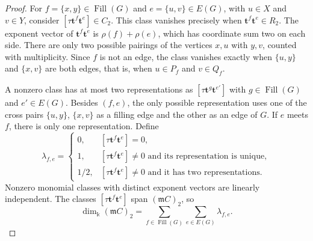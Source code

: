 \documentclass[a4paper,reqno,11pt]{amsart}
\newtheorem{lem}[thm]{Lemma}
\theoremstyle{definition}
\theoremstyle{remark}
\numberwithin{equation}{section}
\newcommand{\kk}{\Bbbk}
\newcommand{\tb}{\mathbf t}
\newcommand{\frakm}{\mathfrak m}
\newcommand{\Fill}{\operatorname{Fill}}
\begin{document}
\begin{proof}
    For $f=\{x,y\}\in\Fill(G)$ and $e=\{u,v\}\in E(G)$, with $u\in X$ and $v\in Y$, consider $[\tau\tb^f\tb^e]\in C_2$.
    This class vanishes precisely when $\tb^f\tb^e\in R_2$.
    The exponent vector of $\tb^f\tb^e$ is $\rho(f)+\rho(e)$, which has coordinate sum two on each side.
    There are only two possible pairings of the vertices $x,u$ with $y,v$, counted with multiplicity.
    Since $f$ is not an edge, the class vanishes exactly when $\{u,y\}$ and $\{x,v\}$ are both edges, that is, when $u\in P_f$ and $v\in Q_f$.

    A nonzero class has at most two representations as $[\tau\tb^g\tb^{e'}]$ with $g\in\Fill(G)$ and $e'\in E(G)$.
    Besides $(f,e)$, the only possible representation uses one of the cross pairs $\{u,y\}$, $\{x,v\}$ as a filling edge and the other as an edge of $G$.
    If $e$ meets $f$, there is only one representation.
    Define
    \[
        \lambda_{f,e}=\begin{cases}
            0,   & [\tau\tb^f\tb^e]=0,                                           \\
            1,   & [\tau\tb^f\tb^e]\ne0\text{ and its representation is unique}, \\
            1/2, & [\tau\tb^f\tb^e]\ne0\text{ and it has two representations}.
        \end{cases}
    \]
    Nonzero monomial classes with distinct exponent vectors are linearly independent.
    The classes $[\tau\tb^f\tb^e]$ span $(\frakm C)_2$, so
    \begin{equation*}
        \dim_\kk (\frakm C)_2 =\sum_{f\in\Fill(G)}\sum_{e\in E(G)}\lambda_{f,e}.
    \end{equation*}


\end{proof}
\end{document}
